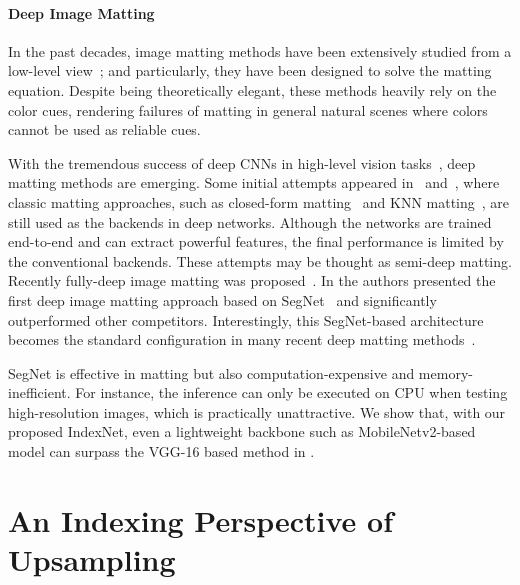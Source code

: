 \documentclass[10pt,twocolumn,letterpaper]{article}
\begin{document}
\paragraph{Deep Image Matting}

In the past decades, image matting methods have been extensively studied from a low-level view~\cite{aksoy2017designing,chen2013knn,chen2013image,chuang2001bayesian,guan2006easy,he2011global,lee2011nonlocal,levin2008closed,sun2004poisson}; and particularly, they have been designed to solve the matting equation. Despite being theoretically elegant, these methods heavily rely on the color cues, rendering failures of matting in general natural scenes where colors cannot be used as reliable cues.

With the tremendous success of deep CNNs in high-level vision tasks~\cite{girshick2014rich,krizhevsky2012imagenet,long2015fully}, deep matting methods are emerging. Some initial attempts appeared in~\cite{cho2016natural} and~\cite{shen2016deep}, where classic matting approaches, such as closed-form matting~\cite{levin2008closed} and KNN matting~\cite{chen2013knn}, are still used as the backends in deep networks. Although the networks are trained end-to-end and can extract powerful features, the final performance is limited by the conventional backends. These attempts may be thought as semi-deep matting. Recently fully-deep image matting was proposed~\cite{xu2017deep}. In \cite{xu2017deep} the authors presented the first deep image matting approach based on SegNet~\cite{badrinarayanan2017segnet} and significantly outperformed other competitors. Interestingly, this SegNet-based architecture becomes the standard configuration in many recent deep matting methods~\cite{chen2018tom,chen2018human,wang2018propagation}.

SegNet is effective in matting but also computation-expensive and memory-inefficient. For instance, the inference can only be executed on CPU when testing high-resolution images, which is practically unattractive.
We show that, with our proposed IndexNet, even a lightweight backbone such as MobileNetv2-based model can surpass the VGG-16 based method in \cite{xu2017deep}.

\section{An Indexing Perspective of Upsampling}
\end{document}
